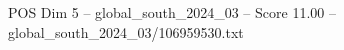 \begin{textsample}{POS Dim 5 – global\_south\_2024\_03 – Score 11.00 – global\_south\_2024\_03/106959530.txt}
\end{textsample}
